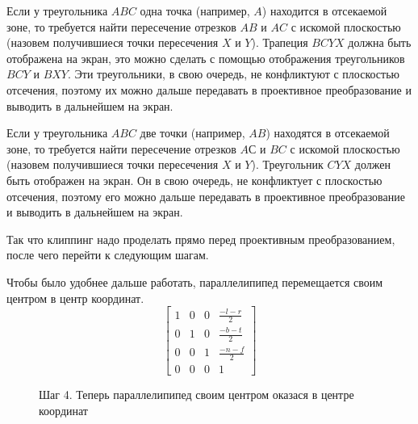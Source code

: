 \documentclass{article}
\begin{document}
Если у треугольника $ABC$ одна точка (например, $A$) находится в отсекаемой зоне, то требуется найти пересечение отрезков $AB$ и $AC$ с искомой плоскостью (назовем получившиеся точки пересечения $X$ и $Y$). Трапеция $BCYX$ должна быть отображена на экран, это можно сделать с помощью отображения треугольников $BCY$ и $BXY$. Эти треугольники, в свою очередь, не конфликтуют с плоскостью отсечения, поэтому их можно дальше передавать в проективное преобразование и выводить в дальнейшем на экран.

Если у треугольника $ABC$ две точки (например, $AB$) находятся в отсекаемой зоне, то требуется найти пересечение отрезков $AС$ и $BC$ с искомой плоскостью (назовем получившиеся точки пересечения $X$ и $Y$). Треугольник $CYX$ должен быть отображен на экран. Он в свою очередь, не конфликтует с плоскостью отсечения, поэтому его можно дальше передавать в проективное преобразование и выводить в дальнейшем на экран.

Так что клиппинг надо проделать прямо перед проективным преобразованием, после чего перейти к следующим шагам.


Чтобы было удобнее дальше работать, параллелипипед перемещается своим центром в центр координат.
$$
\begin{bmatrix}
  1 & 0 & 0 & \frac{-l - r}{2} \\ 
  0 & 1 & 0 & \frac{-b - t}{2} \\
  0 & 0 & 1 & \frac{-n - f}{2} \\
  0 & 0 & 0 & 1\end{bmatrix}
$$


\begin{center}
\begin{figure}[H]
\caption{Шаг 4. Теперь параллелипипед своим центром оказася в центре координат}
\label{ris:image}
\end{figure}
\end{center}
\end{document}
